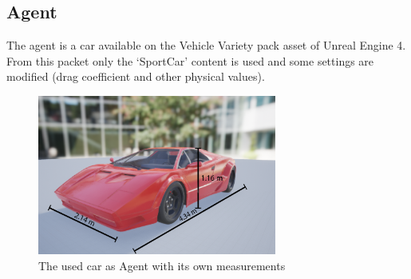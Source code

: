 \documentclass[14pt]{extarticle}
\def\sp{\vspace{5pt}}
\begin{document}
\begin{flushleft}
	\subsection{Agent}
	\sp
	The agent is a car available on the Vehicle Variety pack \cite{VVp} asset of Unreal Engine 4. From this packet only the `SportCar' content is used and some settings are modified (drag coefficient and other physical values).
	\begin{figure}[H]
    		\centering\includegraphics[width=0.7\textwidth]{./Image/Agent/car.png}
		\vspace{5mm}
    		\caption{The used car as Agent with its own measurements}
	\end{figure}
	

\end{flushleft}
\end{document}
